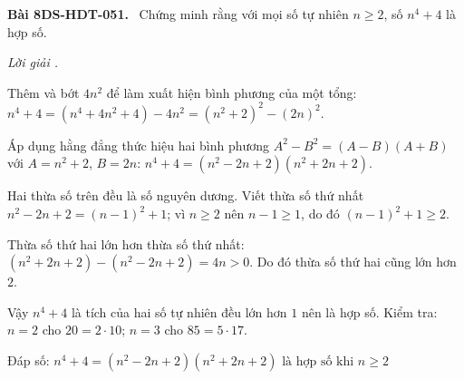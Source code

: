 \documentclass[12pt,a4paper]{article}
\newenvironment{problem}[1][]{\par\medskip\noindent\textbf{Bài #1.}\ }{\par}
\newenvironment{solution}[1][]{\par\noindent\textit{Lời giải #1.}\par}{\par}
\begin{document}
\begin{problem}[8DS-HDT-051]
Chứng minh rằng với mọi số tự nhiên $n \geq 2$, số $n^4 + 4$ là hợp số.

\begin{solution}
Thêm và bớt $4n^2$ để làm xuất hiện bình phương của một tổng: $n^4 + 4 = (n^4 + 4n^2 + 4) - 4n^2 = (n^2 + 2)^2 - (2n)^2$.

Áp dụng hằng đẳng thức hiệu hai bình phương $A^2 - B^2 = (A - B)(A + B)$ với $A = n^2 + 2$, $B = 2n$: $n^4 + 4 = (n^2 - 2n + 2)(n^2 + 2n + 2)$.

Hai thừa số trên đều là số nguyên dương. Viết thừa số thứ nhất $n^2 - 2n + 2 = (n - 1)^2 + 1$; vì $n \geq 2$ nên $n - 1 \geq 1$, do đó $(n - 1)^2 + 1 \geq 2$.

Thừa số thứ hai lớn hơn thừa số thứ nhất: $(n^2 + 2n + 2) - (n^2 - 2n + 2) = 4n > 0$. Do đó thừa số thứ hai cũng lớn hơn $2$.

Vậy $n^4 + 4$ là tích của hai số tự nhiên đều lớn hơn $1$ nên là hợp số. Kiểm tra: $n = 2$ cho $20 = 2 \cdot 10$; $n = 3$ cho $85 = 5 \cdot 17$.

Đáp số: $\boxed{n^4 + 4 = (n^2 - 2n + 2)(n^2 + 2n + 2) \text{ là hợp số khi } n \geq 2}$
\end{solution}
\end{problem}
\end{document}
